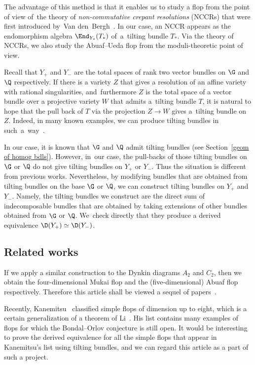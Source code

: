 The advantage of this method is that it enables us to study a flop
from the point of view of~the theory of \textit{non-commutative crepant resolutions} (NCCRs)
that were first introduced by~Van den~Bergh~\cite{VdB04b}.
In our case, an NCCR appears as the endomorphism algebra $\End_{Y_{\ast}}(T_{\ast})$ of~a~til\-ting bundle $T_{\ast}$.
Via the theory of NCCRs, we also study the Abuaf--Ueda flop from the moduli-theoretic point of view.

Recall that $Y_+$ and $Y_-$ are the total spaces of rank two vector bundles on $\G$ and $\Q$ respectively.
If there is a variety $Z$ that gives a resolution of an affine variety with rational singularities, and~furthermore
$Z$ is the total space of a vector bundle over a projective variety $W$ that admits a~tilting bundle $T$,
it is natural to hope that the pull back of $T$ via the projection $Z \to W$ gives a~tilting bundle on $Z$.
Indeed, in many known examples, we can produce tilting bundles in such~a~way~\cite{BLV10, H17a, WZ12}.

In our case, it is known that $\G$ and $\Q$ admit tilting bundles (see Section~\ref{geom of homog bdls}).
However, in~our case, the pull-backs of those tilting bundles on $\G$ or $\Q$ do not give tilting bundles on $Y_+$ or $Y_-$.
Thus the situation is different from previous works.
Nevertheless, by modifying bundles that are obtained from tilting bundles on the base $\G$ or $\Q$,
we can construct tilting bundles on $Y_+$ and $Y_-$.
Namely, the tilting bundles we construct are the direct sum of indecomposable bundles that are obtained by taking extensions of
other bundles obtained from $\G$ or $\Q$.
We~check directly that they produce a derived equivalence $\D(Y_+) \simeq \D(Y_-)$.



\subsection{Related works}
If we apply a similar construction to the Dynkin diagrams $A_2$ and $C_2$,
then we obtain the four-dimensional Mukai flop and the (five-dimensional) Abuaf flop~\cite{Seg16} respectively.
Therefore this article shall be viewed a sequel of papers~\cite{H17a, H17b, Seg16}.

Recently, Kanemitsu~\cite{Kan17} classified simple flops of dimension up to eight, which is a certain generalization of a theorem of Li~\cite{Li17}.
His list contains many examples of flops for which the Bondal--Orlov conjecture is still open.
It would be interesting to prove the derived equivalence for all the simple flops that appear in Kanemitsu's list using tilting bundles,
and we can regard this article as a part of such a project.

